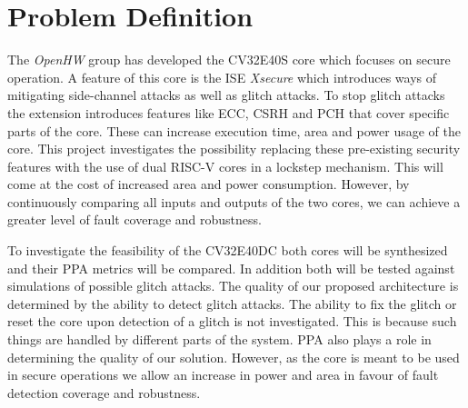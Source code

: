 \section{Problem Definition}
\label{sec:problem_definition}

The \textit{OpenHW} group has developed the CV32E40S core which focuses on secure operation. A feature of this core is the ISE \textit{Xsecure} which introduces ways of mitigating side-channel attacks as well as glitch attacks. To stop glitch attacks the extension introduces features like ECC, CSRH and PCH that cover specific parts of the core. These can increase execution time, area and power usage of the core. This project investigates the possibility replacing these pre-existing security features with the use of dual RISC-V cores in a lockstep mechanism. This will come at the cost of increased area and power consumption. However, by continuously comparing all inputs and outputs of the two cores, we can achieve a greater level of fault coverage and robustness. 

To investigate the feasibility of the CV32E40DC both cores will be synthesized and their PPA metrics will be compared. In addition both will be tested against simulations of possible glitch attacks. The quality of our proposed architecture is determined by the ability to detect glitch attacks. The ability to fix the glitch or reset the core upon detection of a glitch is not investigated. This is because such things are handled by different parts of the system. PPA also plays a role in determining the quality of our solution. However, as the core is meant to be used in secure operations we allow an increase in power and area in favour of fault detection coverage and robustness. 
